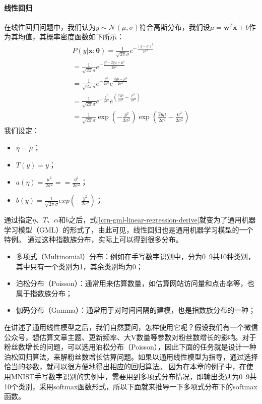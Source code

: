 \documentclass[UTF8]{article}
\begin{document}
\paragraph{线性回归}
在线性回归问题中，我们认为$y \sim \mathcal{N}(\mu, \sigma)$符合高斯分布，我们设$\mu=\boldsymbol{w}^{T}\boldsymbol{x} + b$作为其均值，其概率密度函数如下所示：
\begin{equation}
\begin{aligned}
P(y \vert \boldsymbol{x}; \boldsymbol{\theta}) = \frac{1}{\sqrt{2\pi}\sigma}e^{-\frac{(y-\mu)^{2}}{2\sigma ^{2}}} \\
= \frac{1}{\sqrt{2\pi}\sigma}e^{-\frac{y^{2}-2y\mu + \mu ^{2}}{2\sigma ^{2}}} \\
= \frac{1}{\sqrt{2\pi}\sigma}e^{-\frac{y^{2}}{2\sigma ^{2}}}e^{\frac{2y\mu - \mu ^{2}}{2\sigma ^{2}}} \\
= \frac{1}{\sqrt{2\pi}\sigma}e^{-\frac{y^{2}}{2\sigma ^{2}}}e^{(\frac{2y\mu}{2\sigma ^{2}} - \frac{\mu ^{2}}{2\sigma ^{2}})} \\
= \frac{1}{\sqrt{2\pi}\sigma}\exp(-\frac{y^{2}}{2\sigma ^{2}})\exp(\frac{2y\mu}{2\sigma ^{2}} - \frac{\mu ^{2}}{2\sigma ^{2}})
\end{aligned}
\label{lcrn-gml-linear-regression-derive}
\end{equation}
我们设定：
\begin{itemize}
\item $\eta = \mu$；
\item $T(y)=y$；
\item $a(\eta)=\frac{\mu ^{2}}{2\sigma ^{2}}==\frac{\eta ^{2}}{2\sigma ^{2}}$；
\item $b(y)=\frac{1}{\sqrt{2\pi}\sigma}exp(-\frac{y^{2}}{2\sigma ^{2}})$；
\end{itemize}
通过指定$\eta$、$T$、$\alpha$和$b$之后，式\ref{lcrn-gml-linear-regression-derive}就变为了通用机器学习模型（GML）的形式了，由此可见，线性回归也是通用机器学习模型的一个特例。
通过这种指数族分布，实际上可以得到很多分布。\newline
\begin{itemize}
\item 多项式（Multinomial）分布：例如在手写数字识别中，分为0~9共10种类别，其中只有一个类别为1，其余类别均为0；
\item 泊松分布（Poisson）：通常用来估算数量，如估算网站访问量和点击率等，也属于指数族分布；
\item 伽码分布（Gamma）：通常用于对时间间隔的建模，也是指数族分布的一种；
\end{itemize}
在讲述了通用线性模型之后，我们自然要问，怎样使用它呢？假设我们有一个微信公众号，想估算文章主题、更新频率、大V数量等参数对粉丝数增长的影响。对于粉丝数增长的问题，可以选用泊松分布（Poisson），因此下面的任务就是设计一种泊松回归算法，来解粉丝数增长估算问题。如果以通用线性模型为指导，通过选择恰当的参数，就可以很方便地得出相应的回归算法。
因为在本章的例子中，在使用MNIST手写数字识别的实例中，需要用到多项式分布情况，即输出类别为0~9共10个类别，采用softmax函数形式，所以下面就来推导一下多项式分布下的softmax函数。
\end{document}

